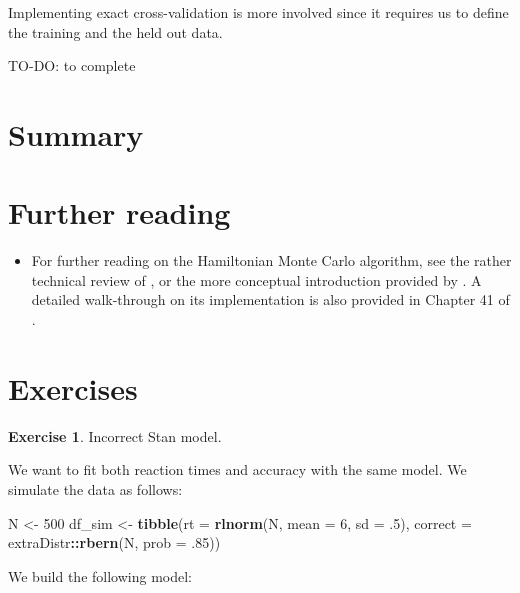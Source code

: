 \documentclass[12pt,]{krantz}
\newenvironment{Shaded}{\begin{snugshade}}{\end{snugshade}}
\newcommand{\KeywordTok}[1]{\textcolor[rgb]{0.13,0.29,0.53}{\textbf{#1}}}
\newcommand{\DataTypeTok}[1]{\textcolor[rgb]{0.13,0.29,0.53}{#1}}
\newcommand{\DecValTok}[1]{\textcolor[rgb]{0.00,0.00,0.81}{#1}}
\newcommand{\FloatTok}[1]{\textcolor[rgb]{0.00,0.00,0.81}{#1}}
\newcommand{\StringTok}[1]{\textcolor[rgb]{0.31,0.60,0.02}{#1}}
\newcommand{\OperatorTok}[1]{\textcolor[rgb]{0.81,0.36,0.00}{\textbf{#1}}}
\newcommand{\NormalTok}[1]{#1}
\providecommand{\tightlist}{%
  \setlength{\itemsep}{0pt}\setlength{\parskip}{0pt}}
\theoremstyle{definition}
\theoremstyle{definition}
\theoremstyle{definition}
\newtheorem{exercise}{Exercise}[chapter]
\theoremstyle{remark}
\begin{document}
Implementing exact cross-validation is more involved since it requires
us to define the training and the held out data.

TO-DO: to complete

\section{Summary}\label{summary-6}

\section{Further reading}\label{further-reading-8}

\begin{itemize}
\tightlist
\item
  For further reading on the Hamiltonian Monte Carlo algorithm, see the
  rather technical review of \citet{betancourt2017conceptual}, or the
  more conceptual introduction provided by
  \citet{monnahanFasterEstimationBayesian2017}. A detailed walk-through
  on its implementation is also provided in Chapter 41 of
  \citet{mackay2003information}.
\end{itemize}

\section{Exercises}\label{exercises-7}

\begin{exercise}
\protect\hypertarget{exr:badstan}{}{\label{exr:badstan} }Incorrect Stan
model. \end{exercise}

We want to fit both reaction times and accuracy with the same model. We
simulate the data as follows:

\begin{Shaded}
\begin{Highlighting}[]
\NormalTok{N <-}\StringTok{ }\DecValTok{500}
\NormalTok{df_sim <-}\StringTok{ }\KeywordTok{tibble}\NormalTok{(}\DataTypeTok{rt =} \KeywordTok{rlnorm}\NormalTok{(N, }\DataTypeTok{mean =} \DecValTok{6}\NormalTok{, }\DataTypeTok{sd =} \FloatTok{.5}\NormalTok{),}
                 \DataTypeTok{correct =}\NormalTok{ extraDistr}\OperatorTok{::}\KeywordTok{rbern}\NormalTok{(N, }\DataTypeTok{prob =} \FloatTok{.85}\NormalTok{))}
\end{Highlighting}
\end{Shaded}

We build the following model:
\end{document}
